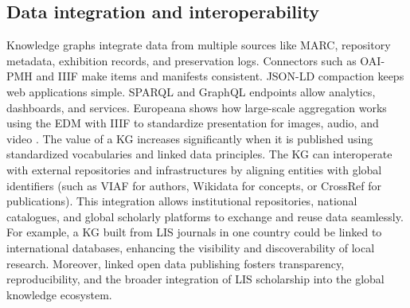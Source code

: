 \documentclass[12pt,a4paper]{article}
\begin{document}
\subsection{Data integration and interoperability}
Knowledge graphs integrate data from multiple sources like MARC, repository metadata, exhibition records, and preservation logs. Connectors such as OAI-PMH and IIIF make items and manifests consistent. JSON-LD compaction keeps web applications simple. SPARQL and GraphQL endpoints allow analytics, dashboards, and services. Europeana shows how large-scale aggregation works using the EDM with IIIF to standardize presentation for images, audio, and video \cite{iiif2025}. The value of a KG increases significantly when it is published using standardized vocabularies and linked data principles. The KG can interoperate with external repositories and infrastructures by aligning entities with global identifiers (such as VIAF for authors, Wikidata for concepts, or CrossRef for publications). This integration allows institutional repositories, national catalogues, and global scholarly platforms to exchange and reuse data seamlessly. For example, a KG built from LIS journals in one country could be linked to international databases, enhancing the visibility and discoverability of local research. Moreover, linked open data publishing fosters transparency, reproducibility, and the broader integration of LIS scholarship into the global knowledge ecosystem.
\end{document}

